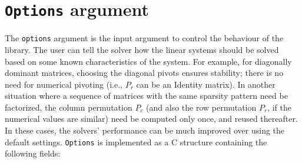 \section{{\tt Options} argument}
The {\tt options} argument is the input argument to control
the behaviour of the library. The user can tell the solver how the linear
systems should be solved based on some known characteristics of the system.
For example, for diagonally dominant matrices, 
choosing the diagonal pivots ensures stability; there is no need for
numerical pivoting (i.e., $P_r$ can be an Identity matrix).
In another situation where a sequence of matrices with the
same sparsity pattern need be factorized, the column
permutation $P_c$ (and also the row permutation $P_r$, if
the numerical values are similar) need be computed only
once, and reused thereafter.
In these cases, the solvers' performance can be much improved over
using the default settings.
{\tt Options} is implemented as a C structure containing the
following fields:
